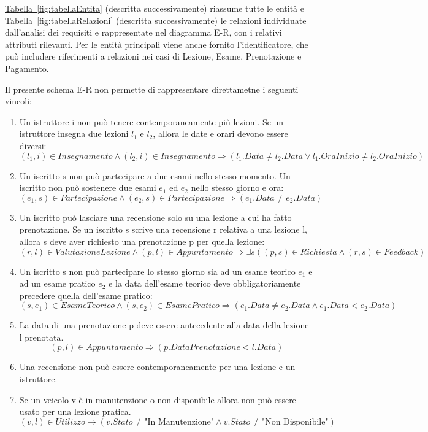 \documentclass[10pt,twoside]{article}
\begin{document}
{    \hyperref[fig:tabellaEntita]{Tabella~\ref*{fig:tabellaEntita}} (descritta successivamente) riassume tutte le entità e \hyperref[fig:tabellaRelazioni]{Tabella~\ref*{fig:tabellaRelazioni}} (descritta successivamente) le relazioni individuate dall'analisi dei requisiti e rappresentate nel diagramma E-R, con i relativi attributi rilevanti.
    Per le entità principali viene anche fornito l'identificatore, che può includere riferimenti a relazioni nei casi di Lezione, Esame, Prenotazione e Pagamento.

    Il presente schema E-R non permette di rappresentare direttametne i seguenti vincoli:

    \begin{enumerate}
        \item Un istruttore i non può tenere contemporaneamente più lezioni. Se un istruttore insegna due lezioni $l_1$ e $l_2$, allora le date e orari devono essere diversi:
        \vspace{-.1cm}
        \[(l_1,i)\in Insegnamento\land (l_2 ,i)\in Insegnamento\Rightarrow(l_1.Data\neq l_2.Data \lor l_1.OraInizio \neq l_2.OraInizio)\]
        \item Un iscritto s non può partecipare a due esami nello stesso momento. Un iscritto non può sostenere due esami $e_1$ ed $e_2$ nello stesso giorno e ora:
        \vspace{-.1cm}
        \[(e_1,s)\in Partecipazione\land (e_2,s)\in Partecipazione\Rightarrow(e_1.Data\neq e_2.Data)\]
        \item Un iscritto può lasciare una recensione solo su una lezione a cui ha fatto prenotazione. Se un iscritto s scrive una recensione r relativa a una lezione l, allora s deve aver richiesto una prenotazione p per quella lezione:
        \vspace{-.1cm}
        \[(r,l)\in ValutazioneLezione \land (p,l)\in Appuntamento\Rightarrow \exists s((p,s)\in Richiesta\land (r,s)\in Feedback)\]
        \item Un iscritto s non può partecipare lo stesso giorno sia ad un esame teorico $e_1$ e ad un esame pratico $e_2$ e la data dell'esame teorico deve obbligatoriamente precedere quella dell'esame pratico:
        \vspace{-.1cm}
        \[(s,e_1)\in EsameTeorico \land (s,e_2)\in EsamePratico\Rightarrow (e_1.Data\neq e_2.Data \land e_1.Data < e_2.Data)\]
        \item La data di una prenotazione p deve essere antecedente alla data della lezione l prenotata.
        \vspace{-.1cm}
        \[(p,l)\in Appuntamento \Rightarrow (p.DataPrenotazione < l.Data)\]
        \item Una recensione non può essere contemporaneamente per una lezione e un istruttore. 
        \item Se un veicolo v è in manutenzione o non disponibile allora non può essere usato per una lezione pratica.
        \[(v,l)\in Utilizzo \rightarrow (v.Stato \neq \text{"In Manutenzione"} \land v.Stato \neq \text{"Non Disponibile"})\] 
    \end{enumerate}

}
\end{document}
